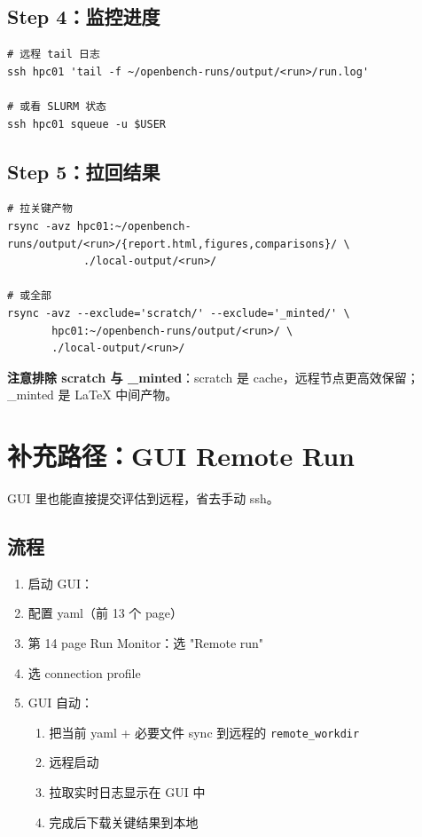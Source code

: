 \subsection{Step 4：监控进度}

\begin{verbatim}
# 远程 tail 日志
ssh hpc01 'tail -f ~/openbench-runs/output/<run>/run.log'

# 或看 SLURM 状态
ssh hpc01 squeue -u $USER
\end{verbatim}

\subsection{Step 5：拉回结果}

\begin{verbatim}
# 拉关键产物
rsync -avz hpc01:~/openbench-runs/output/<run>/{report.html,figures,comparisons}/ \
            ./local-output/<run>/

# 或全部
rsync -avz --exclude='scratch/' --exclude='_minted/' \
       hpc01:~/openbench-runs/output/<run>/ \
       ./local-output/<run>/
\end{verbatim}

\textbf{注意排除 scratch 与 \_minted}：scratch 是 cache，远程节点更高效保留；\_minted 是 LaTeX 中间产物。

\section{补充路径：GUI Remote Run}

GUI 里也能直接提交评估到远程，省去手动 ssh。

\subsection{流程}

\begin{enumerate}
  \item 启动 GUI：
  \item 配置 yaml（前 13 个 page）
  \item 第 14 page Run Monitor：选 "Remote run"
  \item 选 connection profile
  \item GUI 自动：
    \begin{enumerate}
      \item 把当前 yaml + 必要文件 sync 到远程的 \texttt{remote\_workdir}
      \item 远程启动 
      \item 拉取实时日志显示在 GUI 中
      \item 完成后下载关键结果到本地
    \end{enumerate}
\end{enumerate}

